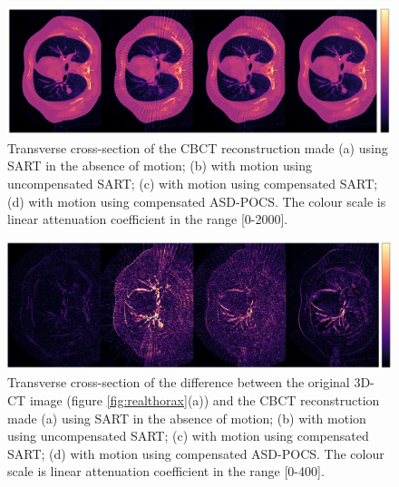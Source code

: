 \begin{figure}[H]
\begin{center} 

\includegraphics[width=1\linewidth]{MotionCorrection/res32.png} 
\hspace{0.1cm}{\footnotesize (a)}\hspace{3.2cm}{\footnotesize (b)}\hspace{3.2cm}{\footnotesize (c)}\hspace{3.2cm}{\footnotesize (d)}

\caption{\label{fig:res3}  Transverse cross-section of the CBCT reconstruction made (a) using SART in the absence of motion; (b) with motion using uncompensated SART; (c) with motion using compensated SART; (d) with motion using compensated ASD-POCS. The colour scale is linear attenuation coefficient in the range [0-2000].} 
\end{center} 
\end{figure}

\begin{figure}[H]
\begin{center} 
\includegraphics[width=1\linewidth]{MotionCorrection/res3err2.png} 
\hspace{0.1cm}{\footnotesize (a)}\hspace{3.2cm}{\footnotesize (b)}\hspace{3.2cm}{\footnotesize (c)}\hspace{3.2cm}{\footnotesize (d)}
\caption{\label{fig:res3err}  Transverse cross-section of the difference  between the original 3D-CT image (figure \ref{fig:realthorax}(a)) and the CBCT reconstruction made (a) using SART in the absence of motion; (b) with motion using uncompensated SART; (c) with motion using compensated SART; (d) with motion using compensated ASD-POCS. The colour scale is linear attenuation coefficient in the range [0-400].} 
\end{center} 
\end{figure}

